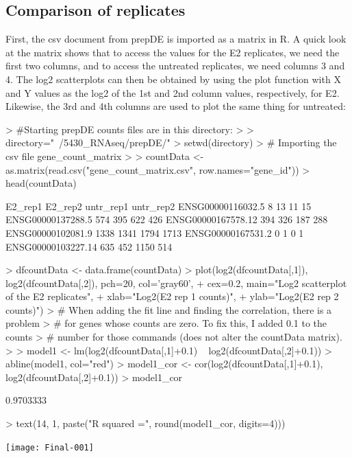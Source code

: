 \documentclass[a4paper,11pt]{article}
\begin{document}
\subsection{Comparison of replicates}
First, the csv document from prepDE is imported as a matrix in R. A quick look at the matrix shows that to access the values for the E2 replicates, we need the first two columns, and to access the untreated replicates, we need columns 3 and 4.
The log2 scatterplots can then be obtained by using the plot function with X and Y values as the log2 of the 1st and 2nd column values, respectively, for E2. Likewise, the 3rd and 4th columns are used to plot the same thing for untreated:

\begin{Schunk}
\begin{Sinput}
> #Starting prepDE counts files are in this directory:
> 
> directory="~/5430_RNAseq/prepDE/"
> setwd(directory)
> # Importing the csv file gene_count_matrix 
> 
> countData <- as.matrix(read.csv("gene_count_matrix.csv", row.names="gene_id"))
> head(countData)
\end{Sinput}
\begin{Soutput}
                   E2_rep1 E2_rep2 untr_rep1 untr_rep2
ENSG00000116032.5        8      13        11        15
ENSG00000137288.5      574     395       622       426
ENSG00000167578.12     394     326       187       288
ENSG00000102081.9     1338    1341      1794      1713
ENSG00000167531.2        0       1         0         1
ENSG00000103227.14     635     452      1150       514
\end{Soutput}
\begin{Sinput}
> dfcountData <- data.frame(countData)
> plot(log2(dfcountData[,1]), log2(dfcountData[,2]), pch=20, col='gray60',
+      cex=0.2, main="Log2 scatterplot of the E2 replicates", 
+      xlab="Log2(E2 rep 1 counts)", 
+      ylab="Log2(E2 rep 2 counts)")
> # When adding the fit line and finding the correlation, there is a problem 
> # for genes whose counts are zero. To fix this, I added 0.1 to the counts
> # number for those commands (does not alter the countData matrix).
> 
> model1 <- lm(log2(dfcountData[,1]+0.1) ~ log2(dfcountData[,2]+0.1))
> abline(model1, col="red")
> model1_cor <- cor(log2(dfcountData[,1]+0.1), log2(dfcountData[,2]+0.1))
> model1_cor
\end{Sinput}
\begin{Soutput}
[1] 0.9703333
\end{Soutput}
\begin{Sinput}
> text(14, 1, paste("R squared =", round(model1_cor, digits=4)))
\end{Sinput}
\end{Schunk}
\texttt{[image: Final-001]}
\end{document}
